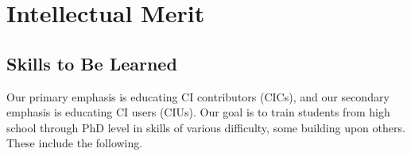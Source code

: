 \documentclass[11pt]{NSFamsart}
\begin{document}

\section{Intellectual Merit}

\subsection{Skills to Be Learned}
Our primary emphasis is educating CI contributors (CICs), and our secondary emphasis is educating CI users (CIUs).  Our goal is to train students from high school through PhD level in skills of various difficulty, some building upon others.  These include the following.
\end{document}
